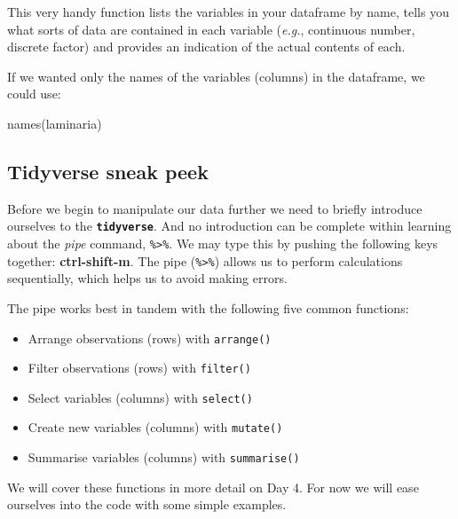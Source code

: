 \documentclass[
]{book}
\newenvironment{Shaded}{\begin{snugshade}}{\end{snugshade}}
\newcommand{\FunctionTok}[1]{\textcolor[rgb]{0.00,0.00,0.00}{#1}}
\newcommand{\NormalTok}[1]{#1}
\providecommand{\tightlist}{%
  \setlength{\itemsep}{0pt}\setlength{\parskip}{0pt}}
\begin{document}
This very handy function lists the variables in your dataframe by name, tells you what sorts of data are contained in each variable (\emph{e.g.}, continuous number, discrete factor) and provides an indication of the actual contents of each.

If we wanted only the names of the variables (columns) in the dataframe, we could use:

\begin{Shaded}
\begin{Highlighting}[]
\FunctionTok{names}\NormalTok{(laminaria)}
\end{Highlighting}
\end{Shaded}

\hypertarget{tidyverse-sneak-peek}{%
\subsection{Tidyverse sneak peek}\label{tidyverse-sneak-peek}}

Before we begin to manipulate our data further we need to briefly introduce ourselves to the \textbf{\texttt{tidyverse}}. And no introduction can be complete within learning about the \emph{pipe} command, \texttt{\%\textgreater{}\%}. We may type this by pushing the following keys together: \textbf{ctrl-shift-m}. The pipe (\texttt{\%\textgreater{}\%}) allows us to perform calculations sequentially, which helps us to avoid making errors.

The pipe works best in tandem with the following five common functions:

\begin{itemize}
\tightlist
\item
  Arrange observations (rows) with \texttt{arrange()}\\
\item
  Filter observations (rows) with \texttt{filter()}\\
\item
  Select variables (columns) with \texttt{select()}\\
\item
  Create new variables (columns) with \texttt{mutate()}\\
\item
  Summarise variables (columns) with \texttt{summarise()}
\end{itemize}

We will cover these functions in more detail on Day 4. For now we will ease ourselves into the code with some simple examples.
\end{document}
